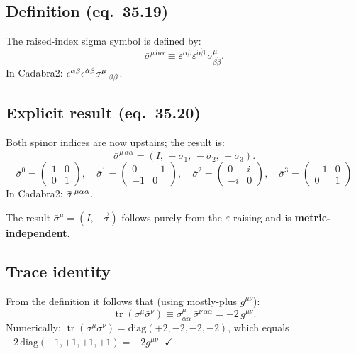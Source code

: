 \subsection{Definition (eq.~35.19)}

The raised-index sigma symbol is defined by:
\begin{equation}
  \bar\sigma^{\mu\,\dot\alpha\alpha}
  \equiv \varepsilon^{\alpha\beta}\varepsilon^{\dot\alpha\dot\beta}\,
         \sigma^\mu_{\beta\dot\beta}.
  \tag{35.19}
\end{equation}
In Cadabra2: $\epsilon^{\alpha \beta} \epsilon^{\dot{\alpha} \dot{\beta}} \sigma^{\mu}\,_{\beta \dot{\beta}}$.

\subsection{Explicit result (eq.~35.20)}

Both spinor indices are now upstairs; the result is:
\begin{equation}
  \bar\sigma^{\mu\,\dot\alpha\alpha}
  = (I,\,-\sigma_1,\,-\sigma_2,\,-\sigma_3).
  \tag{35.20}
\end{equation}
\[
  \bar\sigma^0 = \begin{pmatrix}1 & 0 \\ 0 & 1\end{pmatrix},\quad
  \bar\sigma^1 = \begin{pmatrix}0 & -1 \\ -1 & 0\end{pmatrix},\quad
  \bar\sigma^2 = \begin{pmatrix}0 & i \\ -i & 0\end{pmatrix},\quad
  \bar\sigma^3 = \begin{pmatrix}-1 & 0 \\ 0 & 1\end{pmatrix}
\]
In Cadabra2: $\bar{\sigma}\,^{\mu \dot{\alpha} \alpha}$.

The result $\bar\sigma^\mu = (I,-\vec\sigma)$ follows purely from the
$\varepsilon$ raising and is \textbf{metric-independent}.

\subsection{Trace identity}

From the definition it follows that (using mostly-plus $g^{\mu\nu}$):
\begin{equation}
  \operatorname{tr}(\sigma^\mu\bar\sigma^\nu)
  \equiv \sigma^\mu_{\alpha\dot\alpha}\,\bar\sigma^{\nu\,\dot\alpha\alpha}
  = -2\,g^{\mu\nu}.
  \tag{35-trace}
\end{equation}
Numerically: $\operatorname{tr}(\sigma^\mu\bar\sigma^\nu) = \mathrm{diag}(+2,-2,-2,-2)$,
which equals $-2\,\mathrm{diag}(-1,+1,+1,+1) = -2g^{\mu\nu}$. $\checkmark$

